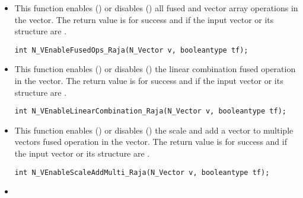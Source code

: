 \begin{itemize}


\item {}

This function enables () or disables () all fused and
vector array operations in the {\raja} vector. The return value is  for
success and  if the input vector or its  structure are .

\verb|int N_VEnableFusedOps_Raja(N_Vector v, booleantype tf);|


\item {}

This function enables () or disables () the linear
combination fused operation in the {\raja} vector. The return value is  for
success and  if the input vector or its  structure are .

\verb|int N_VEnableLinearCombination_Raja(N_Vector v, booleantype tf);|


\item {}

This function enables () or disables () the scale and
add a vector to multiple vectors fused operation in the {\raja} vector. The
return value is  for success and  if the input vector or its
 structure are .

\verb|int N_VEnableScaleAddMulti_Raja(N_Vector v, booleantype tf);|






\item {}


\end{itemize}
